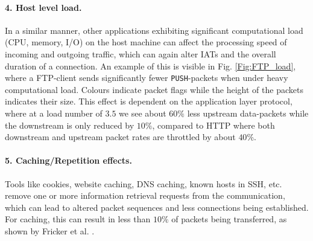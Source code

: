 \documentclass[runningheads]{llncs}
\begin{document}
\paragraph{4. Host level load.}
In a similar manner, other applications exhibiting significant computational load (CPU, memory, I/O) on the host machine can affect the processing speed of incoming and outgoing traffic, which can again alter IATs and the overall duration of a connection. An example of this is visible in Fig. \ref{Fig:FTP_load}, where a FTP-client sends significantly fewer \texttt{PUSH}-packets when under heavy computational load. Colours indicate packet flags while the height of the packets indicates their size. This effect is dependent on the application layer protocol, where at a load number of $3.5$ we see about $60\%$ less upstream data-packets while the downstream is only reduced by $10\%$, compared to HTTP where both downstream and upstream packet rates are throttled by about $40\%$.





\paragraph{5. Caching/Repetition effects.}
Tools like cookies, website caching, DNS caching, known hosts in SSH, etc. remove one or more information retrieval requests from the communication, which can lead to altered packet sequences and less connections being established. For caching, this can result in less than $10\%$ of packets being transferred, as shown by Fricker et al. \cite{fricker2012impact}. 


\end{document}
